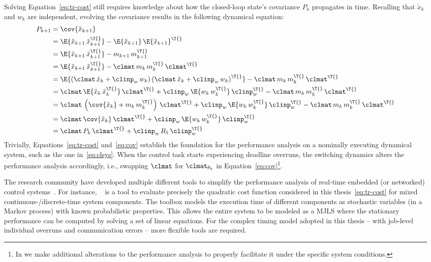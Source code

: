 Solving Equation~\eqref{eq:tr-cost} still requires knowledge about how the closed-loop state's covariance $P_k$ propagates in time.
Recalling that $\tilde{x}_k$ and $w_k$ are independent, evolving the covariance results in the following dynamical equation:
%
\begin{equation}%
    \label{eq:cov}%
    \begin{aligned}
        P_{k+1} &= \cov{\tilde{x}_{k+1}} \\
        &= \E{\tilde{x}_{k+1}\,\tilde{x}_{k+1}^\T{}} - \E{\tilde{x}_{k+1}}\,\E{\tilde{x}_{k+1}}^\T{} \\
        &= \E{\tilde{x}_{k+1}\,\tilde{x}_{k+1}^\T{}} - m_{k+1}\,m_{k+1}^\T{} \\
        &= \E{\tilde{x}_{k+1}\,\tilde{x}_{k+1}^\T{}} - \clmat\, m_{k}\,m_{k}^\T{}\,\clmat^\T{} \\
        &= \E{ \left( \clmat\,\tilde{x}_k + \clinp_w\, w_k \right)\left( \clmat\,\tilde{x}_k + \clinp_w\, w_k \right)^\T{} } - \clmat\, m_{k}\,m_{k}^\T{}\,\clmat^\T{} \\
        &= \clmat\,\E{ \tilde{x}_k\,\tilde{x}_k^\T{} }\,\clmat^\T{} + \clinp_w\,\E{ w_k\,w_k^\T{} }\,\clinp_w^\T{} - \clmat\, m_{k}\,m_{k}^\T{}\,\clmat^\T{} \\
        &= \clmat\,\left( \cov{\tilde{x}_k} + m_k\,m_k^\T{} \right)\,\clmat^\T{} + \clinp_w\,\E{ w_k\,w_k^\T{} }\,\clinp_w^\T{} - \clmat\, m_k\,m_{k}^\T{}\,\clmat^\T{} \\
        &= \clmat\,\cov{\tilde{x}_k}\,\clmat^\T{} + \clinp_w\,\E{ w_k\,w_k^\T{} }\,\clinp_w^\T{} \\
        &= \clmat\,P_k\,\clmat^\T{} + \clinp_w\,R_1\,\clinp_w^\T{}
    \end{aligned}
\end{equation}
%
Trivially, Equations~\eqref{eq:tr-cost} and~\eqref{eq:cov} establish the foundation for the performance analysis on a nominally executing dynamical system, such as the one in~\eqref{eq:clsys}.
When the control task starts experiencing deadline overruns, the switching dynamics alters the performance analysis accordingly, i.e., swapping $\clmat$ for $\clmat_{\theta_k}$ in Equation~\eqref{eq:cov}\footnote{In  we make additional alterations to the performance analysis to properly facilitate it under the specific system conditions.}.

The research community have developed multiple different tools to simplify the performance analysis of real-time embedded (or networked) control systems~\cite{Ohlin:2006}.
For instance, ~\cite{Lincoln:2002} is a tool to evaluate precisely the quadratic cost function considered in this thesis~\eqref{eq:tr-cost} for mixed continuous-/discrete-time system components.
The  toolbox models the execution time of different components as stochastic variables (in a Markov process) with known probabilistic properties.
This allows the entire system to be modeled as a MJLS where the stationary performance can be computed by solving a set of linear equations.
For the complex timing model adopted in this thesis -- with job-level individual overruns and communication errors -- more flexible tools are required.

